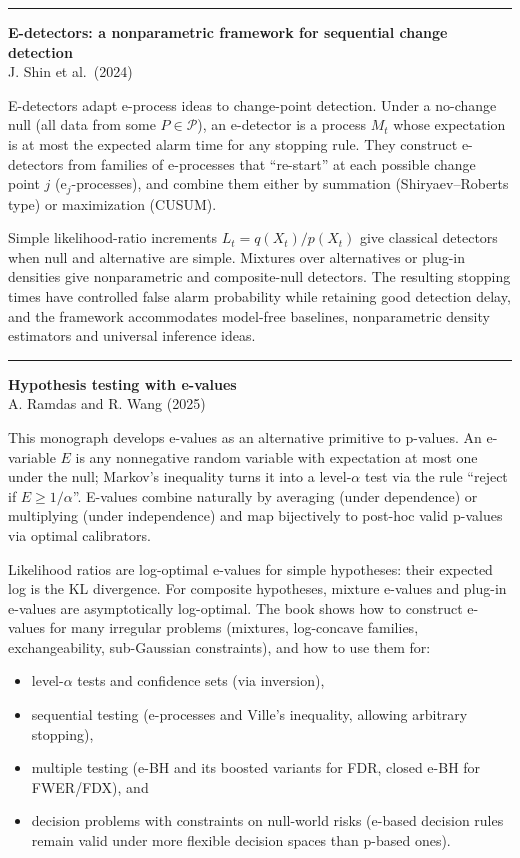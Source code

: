 \documentclass[a5paper]{article}
\let\geq\geqslant
\providecommand{\tightlist}{%
  \setlength{\itemsep}{0pt}\setlength{\parskip}{0pt}}
\begin{document}
\begin{center}\rule{0.5\linewidth}{0.5pt}\end{center}

\textbf{E-detectors: a nonparametric framework for sequential change
detection}\\
J. Shin et al.~(2024)

E-detectors adapt e-process ideas to change-point detection. Under a
no-change null (all data from some $P\in\mathcal{P}$), an e-detector is a process $M_t$
whose expectation is at most the expected alarm time for any stopping
rule. They construct e-detectors from families of e-processes that
``re-start'' at each possible change point $j$ (e$_j$-processes), and combine
them either by summation (Shiryaev--Roberts type) or maximization
(CUSUM).

Simple likelihood-ratio increments $L_t = q(X_t) / p(X_t)$ give classical
detectors when null and alternative are simple. Mixtures over
alternatives or plug-in densities give nonparametric and composite-null
detectors. The resulting stopping times have controlled false alarm
probability while retaining good detection delay, and the framework
accommodates model-free baselines, nonparametric density estimators and
universal inference ideas.

\begin{center}\rule{0.5\linewidth}{0.5pt}\end{center}

\textbf{Hypothesis testing with e-values}\\
A. Ramdas and R. Wang (2025)

This monograph develops e-values as an alternative primitive to
p-values. An e-variable $E$ is any nonnegative random variable with
expectation at most one under the null; Markov's inequality turns it
into a level-$\alpha$ test via the rule ``reject if $E \geq 1/\alpha$''. E-values combine
naturally by averaging (under dependence) or multiplying (under
independence) and map bijectively to post-hoc valid p-values via optimal
calibrators.

Likelihood ratios are log-optimal e-values for simple hypotheses: their
expected log is the KL divergence. For composite hypotheses, mixture
e-values and plug-in e-values are asymptotically log-optimal. The book
shows how to construct e-values for many irregular problems (mixtures,
log-concave families, exchangeability, sub-Gaussian constraints), and
how to use them for:

\begin{itemize}
\tightlist
\item
  level-$\alpha$ tests and confidence sets (via inversion),
\item
  sequential testing (e-processes and Ville's inequality, allowing
  arbitrary stopping),
\item
  multiple testing (e-BH and its boosted variants for FDR, closed e-BH
  for FWER/FDX), and
\item
  decision problems with constraints on null-world risks (e-based
  decision rules remain valid under more flexible decision spaces than
  p-based ones).
\end{itemize}
\end{document}

